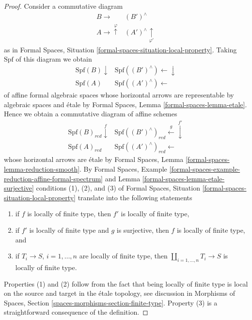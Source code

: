 \begin{proof}
Consider a commutative diagram
$$
\begin{array}{cc}B \longrightarrow & (B')^\wedge \\ A \longrightarrow\overset{\varphi}{\uparrow} & (A')^\wedge \underset{\varphi'}{\uparrow}\end{array}
$$
as in Formal Spaces, Situation
\ref{formal-spaces-situation-local-property}.
Taking $\text{Spf}$ of this diagram we obtain
$$
\begin{array}{cc}\text{Spf}(B) \downarrow & \text{Spf}((B')^\wedge) \longleftarrow\downarrow \\ \text{Spf}(A) & \text{Spf}((A')^\wedge) \longleftarrow\end{array}
$$
of affine formal algebraic spaces whose horizontal arrows are
representable by algebraic spaces and \'etale by
Formal Spaces, Lemma \ref{formal-spaces-lemma-etale}.
Hence we obtain a commutative diagram of affine schemes
$$
\begin{array}{cc}\text{Spf}(B)_{red} \overset{f}{\downarrow} & \text{Spf}((B')^\wedge)_{red} \overset{g}{\longleftarrow}\overset{f'}{\downarrow} \\ \text{Spf}(A)_{red} & \text{Spf}((A')^\wedge)_{red} \longleftarrow\end{array}
$$
whose horizontal arrows are \'etale by
Formal Spaces, Lemma \ref{formal-spaces-lemma-reduction-smooth}.
By Formal Spaces, Example
\ref{formal-spaces-example-reduction-affine-formal-spectrum} and
Lemma \ref{formal-spaces-lemma-etale-surjective}
conditions (1), (2), and (3) of
Formal Spaces, Situation
\ref{formal-spaces-situation-local-property}
translate into the following statements
\begin{enumerate}
\item if $f$ is locally of finite type, then $f'$ is locally of finite type,
\item if $f'$ is locally of finite type and $g$ is surjective, then
$f$ is locally of finite type, and
\item if $T_i \to S$, $i = 1, \ldots, n$ are locally of finite type, then
$\coprod_{i = 1, \ldots, n} T_i \to S$ is locally of finite type.
\end{enumerate}
Properties (1) and (2) follow from the fact that being locally
of finite type is local on the source and target in the
\'etale topology, see discussion in
Morphisms of Spaces, Section \ref{spaces-morphisms-section-finite-type}.
Property (3) is a straightforward consequence of the definition.
\end{proof}

